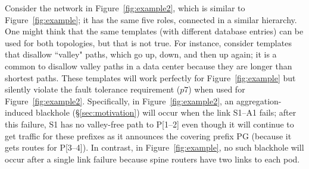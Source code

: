 \documentclass[numbers, 10pt, preprint]{sigplanconf}
\newcommand{\ratul}[1]{\textcolor{blue}{[ratul: #1]}}
\newcommand{\dpw}[1]{\textcolor{tmlblue}{[dpw: #1]}}
\begin{document}
Consider the network in Figure~\ref{fig:example2}, which is similar to Figure~\ref{fig:example}; it has the same five roles, connected in a similar hierarchy. One might think that the same templates (with different database entries) can be used for both topologies, but that is not true. For instance, consider templates that disallow ``valley" paths, which go up, down, and then up again; it is a common to disallow valley paths in a data center because they are longer than shortest paths. These templates will work perfectly for Figure~\ref{fig:example} but silently violate the fault tolerance requirement ($p7$) when used for Figure~\ref{fig:example2}.  Specifically, in Figure~\ref{fig:example2}, an aggregation-induced blackhole (\S\ref{sec:motivation}) will occur when the link S1--A1 fails; after this failure, S1 has no valley-free path to P[1--2] even though it will continue to get traffic for these prefixes as it announces  the covering prefix PG (because it gets routes for P[3--4]). In contrast, in Figure~\ref{fig:example}, no such blackhole will occur after a single link failure because spine routers have two links to each pod.

\end{document}
